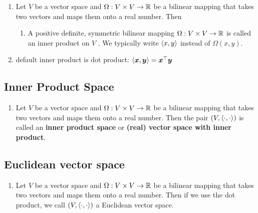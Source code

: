\begin{enumerate}
    \item Let $V$ be a vector space and $\Omega  : V \times  V \to  \mathbb{R}$ be a bilinear mapping that takes two vectors and maps them onto a real number. Then
    \hfill \cite{mfml/book/mml/Deisenroth-Faisal-Ong}
    \begin{enumerate}
        \item A positive definite, symmetric bilinear mapping $\Omega  : V \times  V \to  \mathbb{R}$ is called an inner product on $V$ . 
        We typically write $\langle x, y\rangle$ instead of $\Omega (x, y)$.        
        \hfill \cite{mfml/book/mml/Deisenroth-Faisal-Ong}
    \end{enumerate}

    \item default inner product is dot product: $\langle\bm{x}, \bm{y}\rangle = \bm{x}^\top \bm{y}$
    \hfill \cite{mfml/book/mml/Deisenroth-Faisal-Ong}
\end{enumerate}







\subsection{Inner Product Space}

\begin{enumerate}
    \item Let $V$ be a vector space and $\Omega  : V \times  V \to  \mathbb{R}$ be a bilinear mapping that takes two vectors and maps them onto a real number. 
    Then the pair $(V, \langle\cdot, \cdot\rangle)$ is called an \textbf{inner product space} or \textbf{(real) vector space with inner product}.
\end{enumerate}




\subsection{Euclidean vector space}

\begin{enumerate}
    \item Let $V$ be a vector space and $\Omega : V \times V \to \mathbb{R}$ be a bilinear mapping that takes two vectors and maps them onto a real number. Then if we use the dot product, we call $(V,\langle\cdot, \cdot\rangle)$ a Euclidean vector space.
\end{enumerate}





